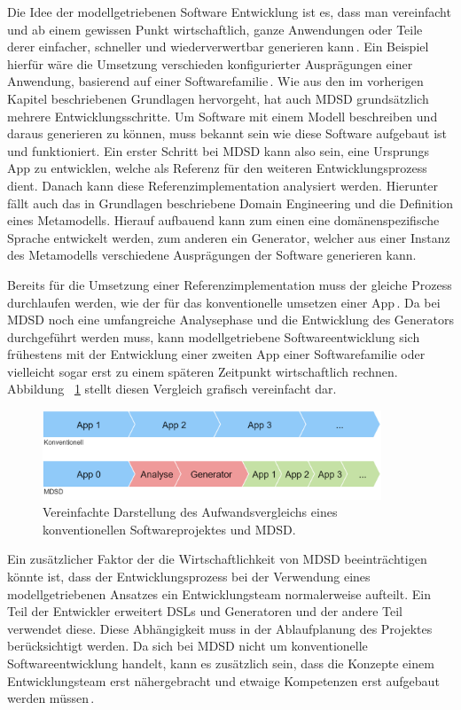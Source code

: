 \documentclass[12pt,oneside,a4paper,parskip]{scrbook}
\begin{document}
Die Idee der modellgetriebenen Software Entwicklung ist es, dass man vereinfacht und ab einem gewissen Punkt wirtschaftlich, ganze Anwendungen oder Teile derer einfacher, schneller und wiederverwertbar generieren kann\,\cite[S. 14f.]{stahl2007}. Ein Beispiel hierfür wäre die Umsetzung verschieden konfigurierter Ausprägungen einer Anwendung, basierend auf einer Softwarefamilie\,\cite[S. 237ff.]{stahl2007}. Wie aus den im vorherigen Kapitel beschriebenen Grundlagen hervorgeht, hat auch MDSD grundsätzlich mehrere Entwicklungsschritte. Um Software mit einem Modell beschreiben und daraus generieren zu können, muss bekannt sein wie diese Software aufgebaut ist und funktioniert. Ein erster Schritt bei MDSD kann also sein, eine Ursprungs App zu entwicklen, welche als Referenz für den weiteren Entwicklungsprozess dient. Danach kann diese Referenzimplementation analysiert werden. Hierunter fällt auch das in Grundlagen beschriebene Domain Engineering und die Definition eines Metamodells. Hierauf aufbauend kann zum einen eine domänenspezifische Sprache entwickelt werden, zum anderen ein Generator, welcher aus einer Instanz des Metamodells verschiedene Ausprägungen der Software generieren kann.

Bereits für die Umsetzung einer Referenzimplementation muss der gleiche Prozess durchlaufen werden, wie der für das konventionelle umsetzen einer App\,\cite[S. 219f.]{stahl2007}. Da bei MDSD noch eine umfangreiche Analysephase und die Entwicklung des Generators durchgeführt werden muss, kann modellgetriebene Softwareentwicklung sich frühestens mit der Entwicklung einer zweiten App einer Softwarefamilie oder vielleicht sogar erst zu einem späteren Zeitpunkt wirtschaftlich rechnen. Abbildung ~\ref{fig:vgl1} stellt diesen Vergleich grafisch vereinfacht dar.

\begin{figure}[htbp]
	\centering
	\includegraphics[width=0.9\textwidth]{bilder/vergleich_1}
	\caption{Vereinfachte Darstellung des Aufwandsvergleichs eines konventionellen Softwareprojektes und MDSD.}
	\label{fig:vgl1}
\end{figure}

Ein zusätzlicher Faktor der die Wirtschaftlichkeit von MDSD beeinträchtigen könnte ist, dass der Entwicklungsprozess bei der Verwendung eines modellgetriebenen Ansatzes ein Entwicklungsteam normalerweise aufteilt. Ein Teil der Entwickler erweitert DSLs und Generatoren und der andere Teil verwendet diese. Diese Abhängigkeit muss in der Ablaufplanung des Projektes berücksichtigt werden. Da sich bei MDSD nicht um konventionelle Softwareentwicklung handelt, kann es zusätzlich sein, dass die Konzepte einem Entwicklungsteam erst nähergebracht und etwaige Kompetenzen erst aufgebaut werden müssen\,\cite[S. 44ff.]{voelter2013}.
\end{document}
